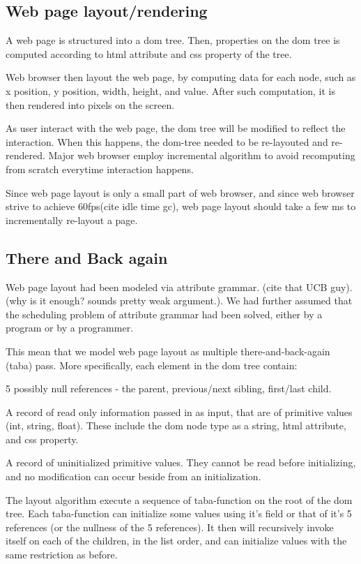 \documentclass[format=acmsmall, review=false, screen=true]{acmart}
\begin{document}
\subsection{Web page layout/rendering}
A web page is structured into a dom tree. Then, properties on the dom tree is computed according to html attribute and css property of the tree.

Web browser then layout the web page, by computing data for each node, such as x position, y position, width, height, and value. After such computation, it is then rendered into pixels on the screen.

As user interact with the web page, the dom tree will be modified to reflect the interaction. When this happens, the dom-tree needed to be re-layouted and re-rendered. Major web browser employ incremental algorithm to avoid recomputing from scratch everytime interaction happens.

Since web page layout is only a small part of web browser, and since web browser strive to achieve 60fps(cite idle time gc), web page layout should take a few ms to incrementally re-layout a page.

\subsection{There and Back again}
Web page layout had been modeled via attribute grammar. (cite that UCB guy). (why is it enough? sounds pretty weak argument.). We had further assumed that the scheduling problem of attribute grammar had been solved, either by a program or by a programmer.

This mean that we model web page layout as multiple there-and-back-again (taba) pass. More specifically, each element in the dom tree contain:

5 possibly null references - the parent, previous/next sibling, first/last child.

A record of read only information passed in as input, that are of primitive values (int, string, float). These include the dom node type as a string, html attribute, and css property.

A record of uninitialized primitive values. They cannot be read before initializing, and no modification can occur beside from an initialization.

The layout algorithm execute a sequence of taba-function on the root of the dom tree. Each taba-function can initialize some values using it's field or that of it's 5 references (or the nullness of the 5 references). It then will recursively invoke itself on each of the children, in the list order, and can initialize values with the same restriction as before.
\end{document}
